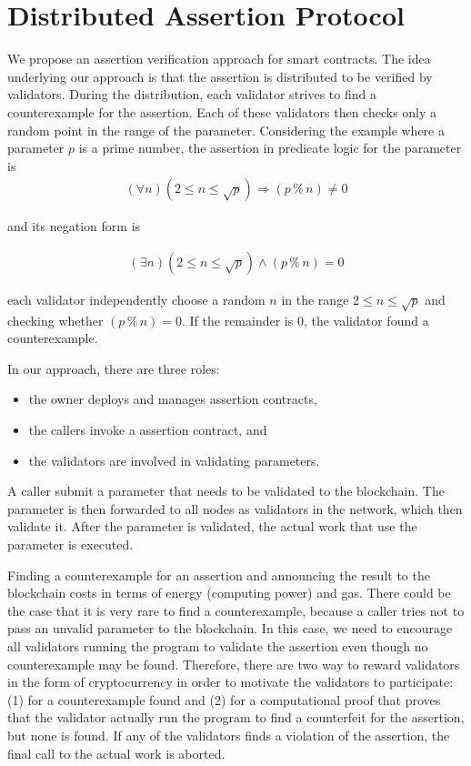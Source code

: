\documentclass[runningheads]{llncs}
\begin{document}
\section{Distributed Assertion Protocol}
\label{sec:approach}
We propose an assertion verification approach for smart contracts. The idea underlying our approach is that the assertion is distributed to be verified by validators. During the distribution, each validator strives to find a counterexample for the assertion. Each of these validators then checks only a random point in the range of the parameter. Considering the example where a parameter $p$ is a prime number, the assertion in predicate logic for the parameter is 
\begin{gather}\label{eq:3a}
  (\forall n) (2 \le n \le \sqrt p) \Rightarrow (p \mathbin{\%} n) \ne 0
\end{gather}


\noindent and its negation form is 

\begin{gather}\label{eq:3b}
  (\exists n) (2 \le n \le \sqrt p) \wedge (p \mathbin{\%} n) = 0
\end{gather}

\noindent each validator independently choose a
random $n$ in the range $2 \le n \le 
\sqrt p$ and checking whether $(p \mathbin{\%} n) = 0$. If the remainder is $0$, the validator found a counterexample.

In our approach, there are three roles: 
\begin{itemize}
   \item the owner deploys and manages assertion contracts, 
   \item the callers invoke a assertion contract, and 
   \item the validators are involved in validating parameters. 
\end{itemize}

\noindent A caller submit a parameter that needs to be validated to the blockchain. The parameter is  then forwarded to all nodes as validators in the network, which then validate it. After the parameter is validated, the actual work that use the parameter is executed. 

Finding a counterexample for an assertion and announcing the result to the blockchain costs in terms of energy (computing power) and gas. There could be the case that it is very rare to find a counterexample, because a caller tries not to pass an unvalid parameter to the blockchain. In this case, we need to encourage all validators running the program to validate the assertion even though no counterexample may be found. Therefore, there are two way to reward validators in the form of cryptocurrency in order to motivate the validators to participate: (1) for a  counterexample found and (2) for a computational proof that proves that the validator actually run the program to find a counterfeit for the assertion, but none is found. If any of the validators finds a violation of the assertion, the final call to the actual work is aborted. 
\end{document}
